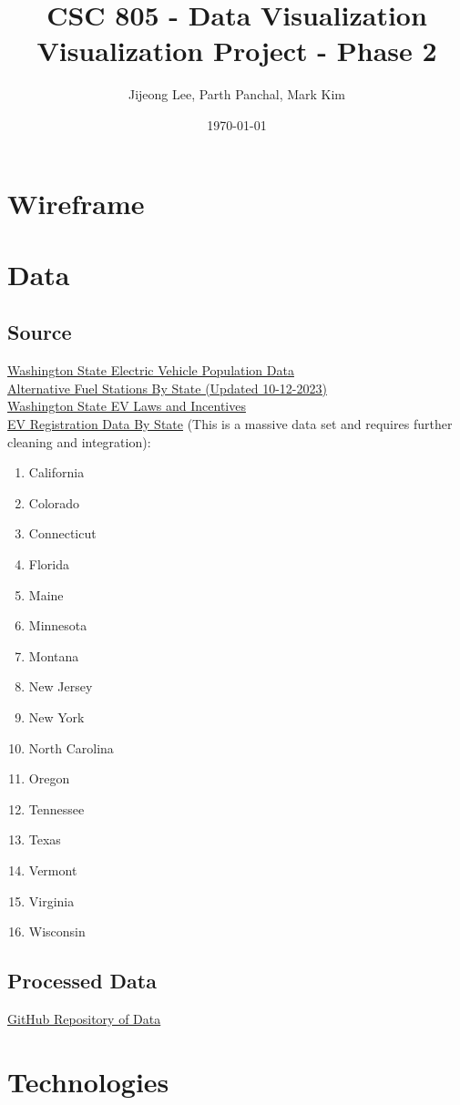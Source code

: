 \documentclass{article}
\title{CSC 805 - Data Visualization\\\large Visualization Project - Phase 2}
\author{Jijeong Lee, Parth Panchal, Mark Kim}
\date{\today}
\begin{document}
\maketitle

\section*{Wireframe}

\section*{Data}
\subsection*{Source}
\href{https://data.wa.gov/Transportation/Electric-Vehicle-Population-Data/f6w7-q2d2}{Washington State Electric Vehicle Population Data}\vspace*{5pt}\\
\href{https://afdc.energy.gov/data_download}{Alternative Fuel Stations By State (Updated 10-12-2023)}\vspace*{5pt}\\
\href{https://afdc.energy.gov/data_download}{Washington State EV Laws and Incentives}\vspace*{5pt}\\
\href{https://www.atlasevhub.com/materials/state-ev-registration-data/}{EV
Registration Data By State} (This is a massive data set and requires further
cleaning and integration):
\begin{multicols}{4}
    \begin{enumerate}
        \item California
        \item Colorado
        \item Connecticut
        \item Florida
        \item Maine
        \item Minnesota
        \item Montana
        \item New Jersey
        \item New York
        \item North Carolina
        \item Oregon
        \item Tennessee
        \item Texas
        \item Vermont
        \item Virginia
        \item Wisconsin
    \end{enumerate}
\end{multicols}
\subsection*{Processed Data}
\href{}{GitHub Repository of Data}
\section*{Technologies}
\end{document}
